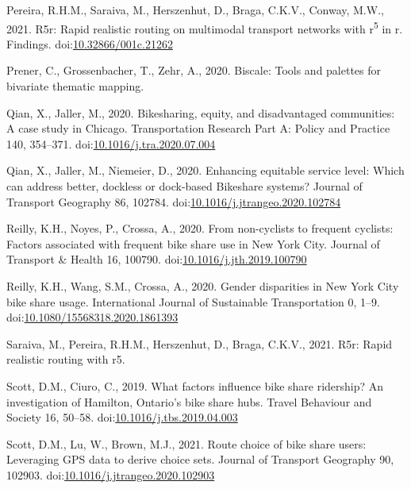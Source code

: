 \documentclass[]{elsarticle} %
\begin{document}
\leavevmode\hypertarget{ref-Pereira2021r5r}{}%
Pereira, R.H.M., Saraiva, M., Herszenhut, D., Braga, C.K.V., Conway,
M.W., 2021. R5r: Rapid realistic routing on multimodal transport
networks with r\textsuperscript{5} in r. Findings.
doi:\href{https://doi.org/10.32866/001c.21262}{10.32866/001c.21262}

\leavevmode\hypertarget{ref-R-biscale}{}%
Prener, C., Grossenbacher, T., Zehr, A., 2020. Biscale: Tools and
palettes for bivariate thematic mapping.

\leavevmode\hypertarget{ref-qianBikesharingEquityDisadvantaged2020}{}%
Qian, X., Jaller, M., 2020. Bikesharing, equity, and disadvantaged
communities: A case study in Chicago. Transportation Research Part A:
Policy and Practice 140, 354--371.
doi:\href{https://doi.org/10.1016/j.tra.2020.07.004}{10.1016/j.tra.2020.07.004}

\leavevmode\hypertarget{ref-qianEnhancingEquitableService2020}{}%
Qian, X., Jaller, M., Niemeier, D., 2020. Enhancing equitable service
level: Which can address better, dockless or dock-based Bikeshare
systems? Journal of Transport Geography 86, 102784.
doi:\href{https://doi.org/10.1016/j.jtrangeo.2020.102784}{10.1016/j.jtrangeo.2020.102784}

\leavevmode\hypertarget{ref-reillyNoncyclistsFrequentCyclists2020}{}%
Reilly, K.H., Noyes, P., Crossa, A., 2020. From non-cyclists to frequent
cyclists: Factors associated with frequent bike share use in New York
City. Journal of Transport \& Health 16, 100790.
doi:\href{https://doi.org/10.1016/j.jth.2019.100790}{10.1016/j.jth.2019.100790}

\leavevmode\hypertarget{ref-reillyGenderDisparitiesNew2020}{}%
Reilly, K.H., Wang, S.M., Crossa, A., 2020. Gender disparities in New
York City bike share usage. International Journal of Sustainable
Transportation 0, 1--9.
doi:\href{https://doi.org/10.1080/15568318.2020.1861393}{10.1080/15568318.2020.1861393}

\leavevmode\hypertarget{ref-R-r5r}{}%
Saraiva, M., Pereira, R.H.M., Herszenhut, D., Braga, C.K.V., 2021. R5r:
Rapid realistic routing with r5.

\leavevmode\hypertarget{ref-scottWhatFactorsInfluence2019}{}%
Scott, D.M., Ciuro, C., 2019. What factors influence bike share
ridership? An investigation of Hamilton, Ontario's bike share hubs.
Travel Behaviour and Society 16, 50--58.
doi:\href{https://doi.org/10.1016/j.tbs.2019.04.003}{10.1016/j.tbs.2019.04.003}

\leavevmode\hypertarget{ref-scottRouteChoiceBike2021}{}%
Scott, D.M., Lu, W., Brown, M.J., 2021. Route choice of bike share
users: Leveraging GPS data to derive choice sets. Journal of Transport
Geography 90, 102903.
doi:\href{https://doi.org/10.1016/j.jtrangeo.2020.102903}{10.1016/j.jtrangeo.2020.102903}
\end{document}

